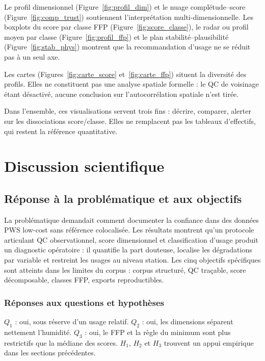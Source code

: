Le profil dimensionnel (Figure~\ref{fig:profil_dim}) et le nuage
complétude--score (Figure~\ref{fig:comp_trust}) soutiennent l'interprétation
multi-dimensionnelle. Les boxplots du score par classe FFP
(Figure~\ref{fig:score_classe}), le radar ou profil moyen par classe
(Figure~\ref{fig:profil_ffp}) et le plan stabilité--plausibilité
(Figure~\ref{fig:stab_phys}) montrent que la recommandation d'usage ne se réduit
pas à un seul axe.

Les cartes (Figures~\ref{fig:carte_score} et~\ref{fig:carte_ffp}) situent la
diversité des profils. Elles ne constituent pas une analyse spatiale formelle :
le QC de voisinage étant désactivé, aucune conclusion sur l'autocorrélation
spatiale n'est tirée.

Dans l'ensemble, ces visualisations servent trois fins : décrire, comparer,
alerter sur les dissociations score/classe. Elles ne remplacent pas les
tableaux d'effectifs, qui restent la référence quantitative.

\section{Discussion scientifique}
\label{sec:discussion}

\subsection{Réponse à la problématique et aux objectifs}

La problématique demandait comment documenter la confiance dans des données PWS
low-cost sans référence colocalisée. Les résultats montrent qu'un protocole
articulant QC observationnel, score dimensionnel et classification d'usage
produit un diagnostic opératoire : il quantifie la part douteuse, localise les
dégradations par variable et restreint les usages au niveau station. Les cinq
objectifs spécifiques sont atteints dans les limites du corpus : corpus
structuré, QC traçable, score décomposable, classes FFP, exports
reproductibles.

\subsubsection{Réponses aux questions et hypothèses}

$Q_1$ : oui, sous réserve d'un usage relatif. $Q_2$ : oui, les dimensions
séparent nettement l'humidité. $Q_3$ : oui, le FFP et la règle du minimum sont
plus restrictifs que la médiane des scores. $H_1$, $H_2$ et $H_3$ trouvent un
appui empirique dans les sections précédentes.

